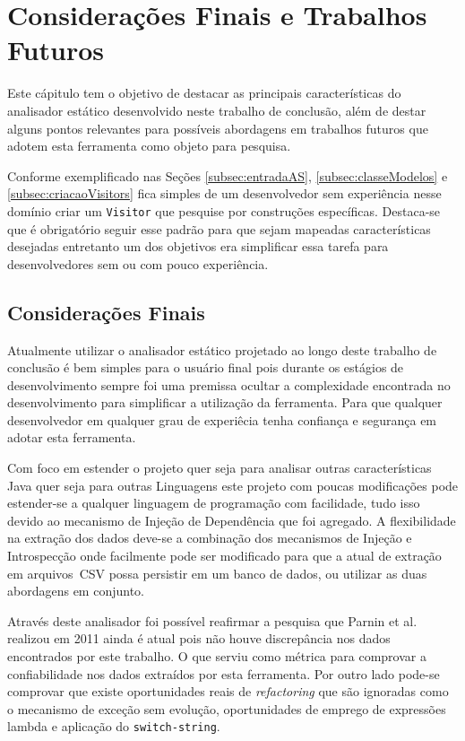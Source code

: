 \chapter{Considerações Finais e Trabalhos Futuros}
Este c\'{a}pitulo tem o objetivo de destacar as principais caracter\'{i}sticas do analisador est\'{a}tico desenvolvido neste trabalho de conclus\~{a}o, al\'{e}m de destar alguns pontos relevantes para poss\'{i}veis abordagens em trabalhos futuros que adotem esta ferramenta como objeto para pesquisa.

Conforme exemplificado nas Seções \ref{subsec:entradaAS}, \ref{subsec:classeModelos} e \ref{subsec:criacaoVisitors} fica simples de um desenvolvedor sem experiência nesse domínio criar um \texttt{Visitor} que pesquise por construções específicas. Destaca-se que é obrigatório seguir esse padrão para que sejam mapeadas características desejadas entretanto um dos objetivos era simplificar essa tarefa para desenvolvedores sem ou com pouco experiência.
 
\section{Considerações Finais}
Atualmente utilizar o analisador est\'{a}tico projetado ao longo deste trabalho de conclus\~{a}o \'{e} bem simples para o usu\'{a}rio final pois durante os est\'{a}gios de desenvolvimento sempre foi uma premissa ocultar a complexidade encontrada no desenvolvimento para simplificar a utiliza\c{c}\~{a}o da ferramenta. Para que qualquer desenvolvedor em qualquer grau de experi\^{e}cia tenha confian\c{c}a e seguran\c{c}a em adotar esta ferramenta.

Com foco em estender o projeto quer seja para analisar outras caracter\'{i}sticas Java quer seja para outras Linguagens este projeto com poucas modifica\c{c}\~{o}es pode estender-se a qualquer linguagem de programa\c{c}\~{a}o com facilidade, tudo isso devido ao mecanismo de Injeção de Dependência  que foi agregado. A flexibilidade na extra\c{c}\~{a}o dos dados deve-se a combina\c{c}\~{a}o dos mecanismos de Inje\c{c}\~{a}o e Introspec\c{c}\~{a}o onde facilmente pode ser modificado para que a atual de extra\c{c}\~{a}o em arquivos~\acs{CSV} possa persistir em um banco de dados, ou utilizar as duas abordagens em conjunto.

Atrav\'{e}s deste analisador foi poss\'{i}vel reafirmar a pesquisa que Parnin et al.~\cite{Parnin:ACM2011} realizou em \num{2011} ainda \'{e} atual pois n\~{a}o houve discrep\^{a}ncia nos dados encontrados por este trabalho. O que serviu como m\'{e}trica para comprovar a confiabilidade nos dados extra\'{i}dos por esta ferramenta. Por outro lado pode-se comprovar que existe oportunidades reais de \textit{refactoring} que s\~{a}o ignoradas como o mecanismo de exce\c{c}\~{a}o sem evolu\c{c}\~{a}o, oportunidades de emprego de express\~{o}es lambda e aplica\c{c}\~{a}o do \texttt{switch-string}.

